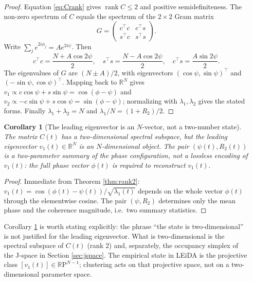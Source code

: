 \documentclass[11pt]{article}
\newtheorem{corollary}{Corollary}
\theoremstyle{definition}
\newcommand{\R}{\mathbb{R}}
\newcommand{\rank}{\operatorname{rank}}
\newcommand{\RP}{\mathbb{R}\mathrm{P}}
\begin{document}
\begin{proof}
Equation \eqref{eq:Crank} gives $\rank C\le2$ and positive semidefiniteness. The
non-zero spectrum of $C$ equals the spectrum of the $2\times2$ Gram matrix
\begin{equation}
G=\begin{pmatrix}c^{\top}c & c^{\top}s\\ s^{\top}c & s^{\top}s\end{pmatrix}.
\end{equation}
Write $\sum_j e^{2i\phi_j}=A e^{2i\psi}$. Then
\begin{equation}
c^{\top}c=\frac{N+A\cos2\psi}{2},\quad
s^{\top}s=\frac{N-A\cos2\psi}{2},\quad
c^{\top}s=\frac{A\sin2\psi}{2}.
\end{equation}
The eigenvalues of $G$ are $(N\pm A)/2$, with eigenvectors
$(\cos\psi,\sin\psi)^{\top}$ and $(-\sin\psi,\cos\psi)^{\top}$. Mapping back to $\R^N$
gives $v_1\propto c\cos\psi+s\sin\psi=\cos(\phi-\psi)$ and
$v_2\propto-c\sin\psi+s\cos\psi=\sin(\phi-\psi)$; normalizing with $\lambda_1,\lambda_2$
gives the stated forms. Finally $\lambda_1+\lambda_2=N$ and
$\lambda_1/N=(1+R_2)/2$.
\end{proof}

\begin{corollary}[The leading eigenvector is an $N$-vector, not a two-number state]
\label{cor:not2d}
The matrix $C(t)$ has a two-dimensional \emph{spectral subspace}, but the leading
eigenvector $v_1(t)\in\R^N$ is an $N$-dimensional object. The pair $(\psi(t),R_2(t))$ is
a two-parameter summary of the phase configuration, not a lossless encoding of
$v_1(t)$: the full phase vector $\phi(t)$ is required to reconstruct $v_1(t)$.
\end{corollary}

\begin{proof}
Immediate from Theorem \ref{thm:rank2}:
$v_1(t)=\cos(\phi(t)-\psi(t))/\sqrt{\lambda_1(t)}$ depends on the whole vector $\phi(t)$
through the elementwise cosine. The pair $(\psi,R_2)$ determines only the mean phase and
the coherence magnitude, i.e.\ two summary statistics.
\end{proof}

Corollary \ref{cor:not2d} is worth stating explicitly: the phrase ``the state is
two-dimensional'' is not justified for the leading eigenvector. What is
two-dimensional is the spectral subspace of $C(t)$ (rank 2) and, separately, the
occupancy simplex of the J-space in Section \ref{sec:jspace}. The empirical state in
LEiDA is the projective class $[v_1(t)]\in\RP^{N-1}$; clustering acts on that projective
space, not on a two-dimensional parameter space.
\end{document}
